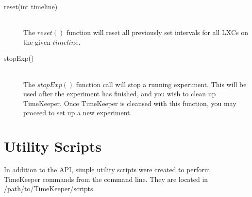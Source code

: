 \begin{description}
\item[reset(int timeline) ] \hfill \\
The $reset()$ function will reset all previously set intervals for all LXCs on the given $timeline$. 
\item[stopExp()] \hfill \\
The $stopExp()$ function call will stop a running experiment. This will be used after the experiment has finished, and you wish to clean up TimeKeeper. Once TimeKeeper is cleansed with this function, you may proceed to set up a new experiment.
\end{description}

\section{Utility Scripts}
In addition to the API, simple utility scripts were created to perform TimeKeeper commands from the command line. They are located in /path/to/TimeKeeper/scripts.
